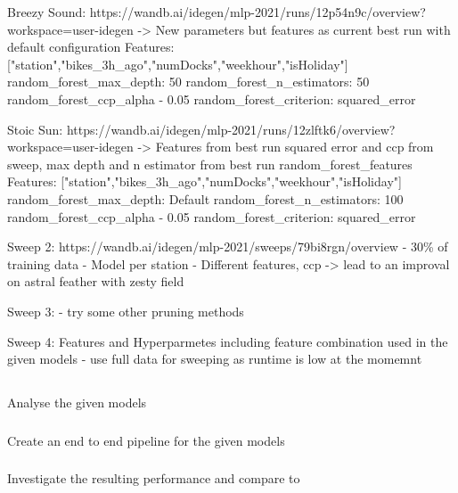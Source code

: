\documentclass[a4paper]{article}
\begin{document}
    Breezy Sound: https://wandb.ai/idegen/mlp-2021/runs/12p54n9c/overview?workspace=user-idegen
    -> New parameters but features as current best run with default configuration
    Features: ["station","bikes\_3h\_ago","numDocks","weekhour","isHoliday"]
    random\_forest\_max\_depth: 50
    random\_forest\_n\_estimators: 50
    random\_forest\_ccp\_alpha - 0.05
    random\_forest\_criterion: squared\_error

    Stoic Sun: https://wandb.ai/idegen/mlp-2021/runs/12zlftk6/overview?workspace=user-idegen
    -> Features from best run squared error and ccp from sweep, max depth and n estimator from best run
    random\_forest\_features
    Features: ["station","bikes\_3h\_ago","numDocks","weekhour","isHoliday"]
    random\_forest\_max\_depth: Default
    random\_forest\_n\_estimators: 100
    random\_forest\_ccp\_alpha - 0.05
    random\_forest\_criterion: squared\_error

    Sweep 2: https://wandb.ai/idegen/mlp-2021/sweeps/79bi8rgn/overview
    - 30\% of training data
    - Model per station
    - Different features, ccp
    -> lead to an improval on astral feather with zesty field

    Sweep 3:
    - try some other pruning methods

    Sweep 4: Features and Hyperparmetes including feature combination used in the given models
    - use full data for sweeping as runtime is low at the momemnt


    \subsection*{}
    \subsubsection*{} Analyse the given models
    \subsubsection*{} Create an end to end pipeline for the given models
    \subsubsection*{} Investigate the resulting performance and compare to 

    \subsection*{}
\end{document}

